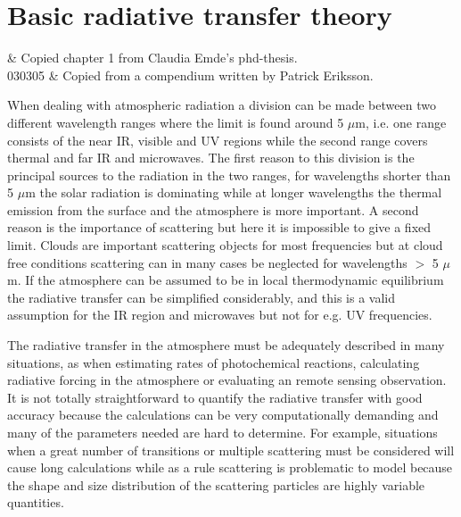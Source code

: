 \graphicspath{{Figs/rte_theory/}}

\newcommand{\ColVctTwo}[2]{\left[
    \begin{array}{c} #1\\ #2
    \end{array} \right] }

\newcommand{\ColVctFour}[4]{\left[
    \begin{array}{c} #1\\ #2 \\ #3 \\ #4
    \end{array} \right] }

\chapter{Basic radiative transfer theory}


 & Copied chapter 1 from Claudia Emde's phd-thesis. \\
  030305 & Copied from a compendium written by Patrick Eriksson.
\stophistory


 When dealing with atmospheric radiation a division can be made
 between two different wavelength ranges where the limit is found
 around 5 $\mu$m, i.e. one range consists of the near IR, visible and UV
 regions while the second range covers thermal and far IR and
 microwaves. The first reason to this division is the principal
 sources to the radiation in the two ranges, for wavelengths shorter
 than 5 $\mu$m the solar radiation is dominating while at longer
 wavelengths the thermal emission from the surface and the atmosphere
 is more important. A second reason is the importance of scattering
 but here it is impossible to give a fixed limit. Clouds are important
 scattering objects for most frequencies but at cloud free conditions
 scattering can in many cases be neglected for wavelengths $>$ 5 $\mu$m. If
 the atmosphere can be assumed to be in local thermodynamic
 equilibrium the radiative transfer can be simplified considerably,
 and this is a valid assumption for the IR region and microwaves but
 not for e.g. UV frequencies.
 
 The radiative transfer in the atmosphere must be adequately described
 in many situations, as when estimating rates of photochemical
 reactions, calculating radiative forcing in the atmosphere or
 evaluating an remote sensing observation. It is not totally
 straightforward to quantify the radiative transfer with good accuracy
 because the calculations can be very computationally demanding and
 many of the parameters needed are hard to determine. For example,
 situations when a great number of transitions or multiple scattering
 must be considered will cause long calculations while as a rule
 scattering is problematic to model because the shape and size
 distribution of the scattering particles are highly variable
 quantities.  

